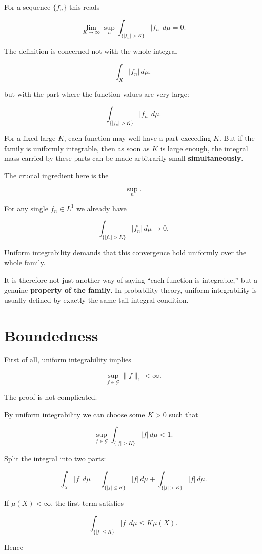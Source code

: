 \documentclass[11pt]{article}
\begin{document}
For a sequence $\{f_n\}$ this reads

\[
\lim_{K\to\infty}
\sup_n
\int_{\{|f_n|>K\}}
|f_n|\,d\mu
=
0.
\]

The definition is concerned not with the whole integral

\[
\int_X|f_n|\,d\mu,
\]

but with the part where the function values are very large:

\[
\int_{\{|f_n|>K\}}|f_n|\,d\mu.
\]

For a fixed large $K$, each function may well have a part exceeding $K$. But if the family is uniformly integrable, then as soon as $K$ is large enough, the integral mass carried by these parts can be made arbitrarily small \textbf{simultaneously}.

The crucial ingredient here is the

\[
\sup_n.
\]

For any single $f_n\in L^1$ we already have

\[
\int_{\{|f_n|>K\}}|f_n|\,d\mu\to0.
\]

Uniform integrability demands that this convergence hold uniformly over the whole family.

It is therefore not just another way of saying ``each function is integrable,'' but a genuine \textbf{property of the family}. In probability theory, uniform integrability is usually defined by exactly the same tail-integral condition.


\section{Boundedness}


First of all, uniform integrability implies

\[
\sup_{f\in\mathcal G}
\|f\|_1<\infty.
\]

The proof is not complicated.

By uniform integrability we can choose some $K>0$ such that

\[
\sup_{f\in\mathcal G}
\int_{\{|f|>K\}}|f|\,d\mu
<1.
\]

Split the integral into two parts:

\[
\int_X|f|\,d\mu
=
\int_{\{|f|\leq K\}}|f|\,d\mu
+
\int_{\{|f|>K\}}|f|\,d\mu.
\]

If $\mu(X)<\infty$, the first term satisfies

\[
\int_{\{|f|\leq K\}}|f|\,d\mu
\leq
K\mu(X).
\]

Hence
\end{document}
